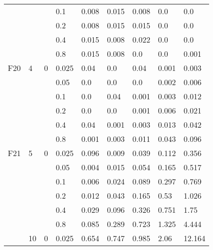 \begin{longtable}{|l|l|l|l|l|l|l|l|l|}
\cmidrule{4-9} &     &          & 0.1            & 0.008      & 0.015      & 0.008      & 0.0        & 0.0        \\
\cmidrule{4-9} &     &          & 0.2            & 0.008      & 0.015      & 0.015      & 0.0        & 0.0        \\
\cmidrule{4-9} &     &          & 0.4            & 0.015      & 0.008      & 0.022      & 0.0        & 0.0        \\
\cmidrule{4-9} &     &          & 0.8            & 0.015      & 0.008      & 0.0        & 0.0        & 0.001      \\ \midrule
F20            & 4   & 0        & 0.025          & 0.04       & 0.0        & 0.04       & 0.001      & 0.003      \\
\cmidrule{4-9} &     &          & 0.05           & 0.0        & 0.0        & 0.0        & 0.002      & 0.006      \\
\cmidrule{4-9} &     &          & 0.1            & 0.0        & 0.04       & 0.001      & 0.003      & 0.012      \\
\cmidrule{4-9} &     &          & 0.2            & 0.0        & 0.0        & 0.001      & 0.006      & 0.021      \\
\cmidrule{4-9} &     &          & 0.4            & 0.04       & 0.001      & 0.003      & 0.013      & 0.042      \\
\cmidrule{4-9} &     &          & 0.8            & 0.001      & 0.003      & 0.011      & 0.043      & 0.096      \\ \midrule
F21            & 5   & 0        & 0.025          & 0.096      & 0.009      & 0.039      & 0.112      & 0.356      \\
\cmidrule{4-9} &     &          & 0.05           & 0.004      & 0.015      & 0.054      & 0.165      & 0.517      \\
\cmidrule{4-9} &     &          & 0.1            & 0.006      & 0.024      & 0.089      & 0.297      & 0.769      \\
\cmidrule{4-9} &     &          & 0.2            & 0.012      & 0.043      & 0.165      & 0.53       & 1.026      \\
\cmidrule{4-9} &     &          & 0.4            & 0.029      & 0.096      & 0.326      & 0.751      & 1.75       \\
\cmidrule{4-9} &     &          & 0.8            & 0.085      & 0.289      & 0.723      & 1.325      & 4.444      \\
\cmidrule{2-9} & 10  & 0        & 0.025          & 0.654      & 0.747      & 0.985      & 2.06       & 12.164     \\

\end{longtable}
